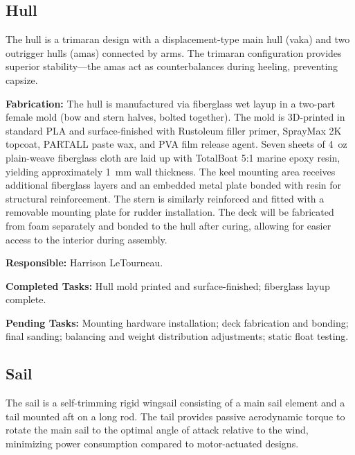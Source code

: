 
\subsection{Hull}

The hull is a trimaran design with a displacement-type main hull (vaka) and two outrigger hulls (amas) connected by arms. The trimaran configuration provides superior stability---the amas act as counterbalances during heeling, preventing capsize.

\textbf{Fabrication:} The hull is manufactured via fiberglass wet layup in a two-part female mold (bow and stern halves, bolted together). The mold is 3D-printed in standard PLA and surface-finished with Rustoleum filler primer, SprayMax 2K topcoat, PARTALL paste wax, and PVA film release agent. Seven sheets of 4~oz plain-weave fiberglass cloth are laid up with TotalBoat 5:1 marine epoxy resin, yielding approximately 1~mm wall thickness. The keel mounting area receives additional fiberglass layers and an embedded metal plate bonded with resin for structural reinforcement. The stern is similarly reinforced and fitted with a removable mounting plate for rudder installation. The deck will be fabricated from foam separately and bonded to the hull after curing, allowing for easier access to the interior during assembly.

\textbf{Responsible:} Harrison LeTourneau.

\textbf{Completed Tasks:} Hull mold printed and surface-finished; fiberglass layup complete.

\textbf{Pending Tasks:} Mounting hardware installation; deck fabrication and bonding; final sanding; balancing and weight distribution adjustments; static float testing.


\subsection{Sail}

The sail is a self-trimming rigid wingsail consisting of a main sail element and a tail mounted aft on a long rod. The tail provides passive aerodynamic torque to rotate the main sail to the optimal angle of attack relative to the wind, minimizing power consumption compared to motor-actuated designs.

